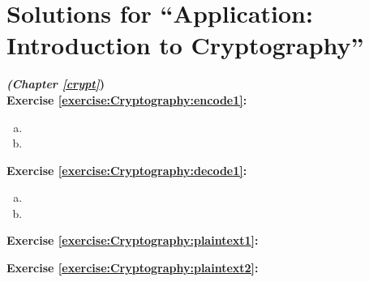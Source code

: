
\section{Solutions for ``Application: Introduction to Cryptography''}
\noindent\textbf{\textit{ (Chapter \ref{crypt}})}\bigskip
\\
\noindent\textbf{Exercise \ref{exercise:Cryptography:encode1}:}
\begin{enumerate}[(a)]
\item
\item
\end{enumerate}

\noindent\textbf{Exercise \ref{exercise:Cryptography:decode1}:}
\begin{enumerate}[(a)]
\item
\item
\end{enumerate}



\noindent\textbf{Exercise \ref{exercise:Cryptography:plaintext1}:}  
%
%

\noindent\textbf{Exercise \ref{exercise:Cryptography:plaintext2}:}
%
%



